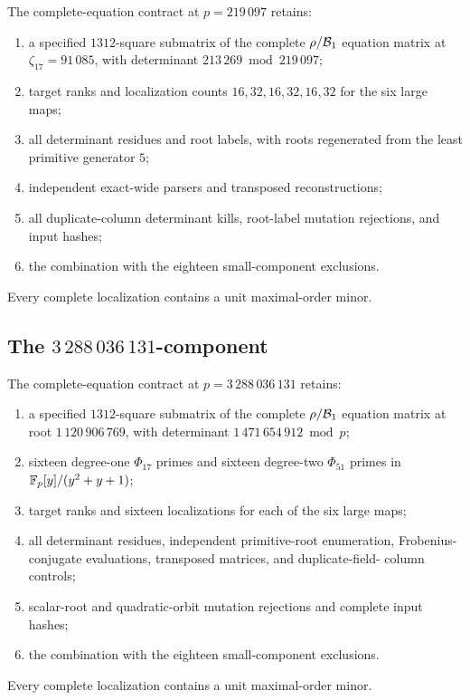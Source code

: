 The complete-equation contract at \(p=219\,097\) retains:
\begin{enumerate}
  \item a specified \(1312\)-square submatrix of the complete
  \(\rho/\mathcal B_1\) equation matrix at \(\zeta_{17}=91\,085\), with
  determinant \(213\,269\bmod219\,097\);
  \item target ranks and localization counts
  \(16,32,16,32,16,32\) for the six large maps;
  \item all determinant residues and root labels, with roots regenerated
  from the least primitive generator \(5\);
  \item independent exact-wide parsers and transposed reconstructions;
  \item all duplicate-column determinant kills, root-label mutation
  rejections, and input hashes;
  \item the combination with the eighteen small-component exclusions.
\end{enumerate}
Every complete localization contains a unit maximal-order minor.

\subsection{The \(3\,288\,036\,131\)-component}

The complete-equation contract at \(p=3\,288\,036\,131\) retains:
\begin{enumerate}
  \item a specified \(1312\)-square submatrix of the complete
  \(\rho/\mathcal B_1\) equation matrix at root \(1\,120\,906\,769\), with
  determinant \(1\,471\,654\,912\bmod p\);
  \item sixteen degree-one \(\Phi_{17}\) primes and sixteen degree-two
  \(\Phi_{51}\) primes in \(\mathbb F_p[y]/(y^2+y+1)\);
  \item target ranks and sixteen localizations for each of the six large
  maps;
  \item all determinant residues, independent primitive-root enumeration,
  Frobenius-conjugate evaluations, transposed matrices, and duplicate-field-
  column controls;
  \item scalar-root and quadratic-orbit mutation rejections and complete
  input hashes;
  \item the combination with the eighteen small-component exclusions.
\end{enumerate}
Every complete localization contains a unit maximal-order minor.

